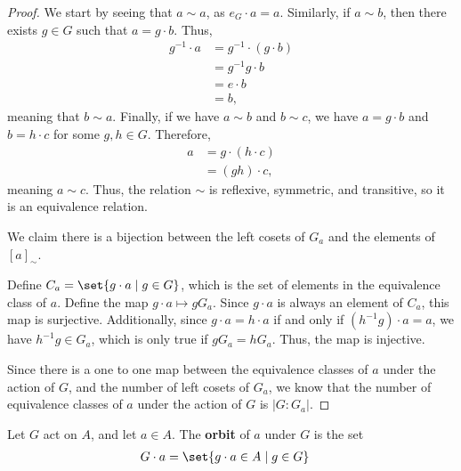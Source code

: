 \begin{proof}
  We start by seeing that $a\sim a$, as $e_G\cdot a = a$. Similarly, if $a\sim b$, then there exists $g\in G$ such that $a = g\cdot b$. Thus,
  \begin{align*}
    g^{-1}\cdot a &= g^{-1}\cdot \left(g\cdot b\right)\\
                  &= g^{-1}g\cdot b\\
                  &= e\cdot b\\
                  &= b,
  \end{align*}
  meaning that $b\sim a$. Finally, if we have $a\sim b$ and $b\sim c$, we have $a = g\cdot b$ and $b = h\cdot c$ for some $g,h\in G$. Therefore,
  \begin{align*}
    a &= g\cdot \left(h\cdot c\right)\\
      &= \left(gh\right)\cdot c,
  \end{align*}
  meaning $a\sim c$. Thus, the relation $\sim$ is reflexive, symmetric, and transitive, so it is an equivalence relation.\newline

  We claim there is a bijection between the left cosets of $G_a$ and the elements of $\left[a\right]_{\sim}$.\newline

  Define $C_a = \set{g\cdot a\mid g\in G}$, which is the set of elements in the equivalence class of $a$. Define the map $g\cdot a \mapsto gG_a$. Since $g\cdot a$ is always an element of $C_a$, this map is surjective. Additionally, since $g\cdot a = h\cdot a$ if and only if $\left(h^{-1}g\right)\cdot a = a$, we have $h^{-1}g \in G_a$, which is only true if $gG_a = hG_a$. Thus, the map is injective.\newline

  Since there is a one to one map between the equivalence classes of $a$ under the action of $G$, and the number of left cosets of $G_a$, we know that the number of equivalence classes of $a$ under the action of $G$ is $\left\vert G:G_a \right\vert$.
\end{proof}
\begin{definition}[Orbit]
  Let $G$ act on $A$, and let $a\in A$. The \textbf{orbit} of $a$ under $G$ is the set
\begin{align*}
  G\cdot a &= \set{g\cdot a\in A\mid g\in G}
\end{align*}
\end{definition}
